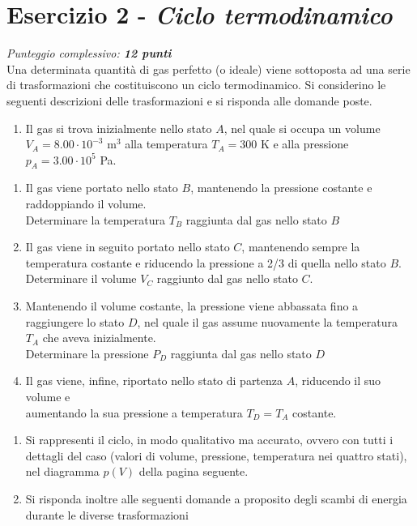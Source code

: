 \documentclass{article}
\begin{document}
\pagebreak


\section*{Esercizio 2 - \textit{Ciclo termodinamico}}
\vspace{-3mm} {\textit{Punteggio complessivo: \textbf{12 punti}}} \vspace{5mm} \\
Una determinata quantità di gas perfetto (o ideale) viene sottoposta ad una serie 
di trasformazioni che costituiscono un ciclo termodinamico. Si considerino le 
seguenti descrizioni delle trasformazioni e si risponda alle domande poste.

\begin{enumerate}[label=\textbf{\alph*)}]
    \item Il gas si trova inizialmente nello stato $A$, nel quale si occupa un
        volume $V_A = 8.00 \cdot 10^{-3}$ m$^3$ alla temperatura
        $T_A = 300$ K e alla pressione $p_A = 3.00 \cdot 10^5$ Pa.
\end{enumerate}
\begin{enumerate}[label=\textbf{\roman*)}, leftmargin=1.5cm]
    \item Il gas viene portato nello stato $B$, mantenendo la pressione
        costante e raddoppiando il volume. \\
        Determinare la temperatura $T_B$ raggiunta dal gas nello stato $B$
    \item Il gas viene in seguito portato nello stato $C$, mantenendo sempre
        la temperatura costante e riducendo la pressione a 2/3 di
        quella nello stato $B$. \\
        Determinare il volume $V_C$ raggiunto dal gas nello stato $C$.
    \item Mantenendo il volume costante, la pressione viene abbassata fino a 
        raggiungere lo stato $D$, nel quale il gas assume nuovamente la
        temperatura $T_A$ che aveva inizialmente. \\
        Determinare la pressione $P_D$ raggiunta dal gas nello stato $D$
    \item Il gas viene, infine, riportato nello stato di partenza $A$,
        riducendo il suo volume e \\ aumentando la sua pressione a temperatura
        $T_D = T_A$ costante. 
\end{enumerate}
\begin{enumerate}[label=\textbf{\alph*)}, start=2]
    \item Si rappresenti il ciclo, in modo qualitativo ma accurato, 
        ovvero con tutti i dettagli del caso (valori di volume, pressione, 
        temperatura nei quattro stati), nel diagramma $p(V)$ della pagina 
        seguente.
    \item Si risponda inoltre alle seguenti domande a proposito degli scambi
        di energia durante le diverse trasformazioni
\end{enumerate}
\end{document}
